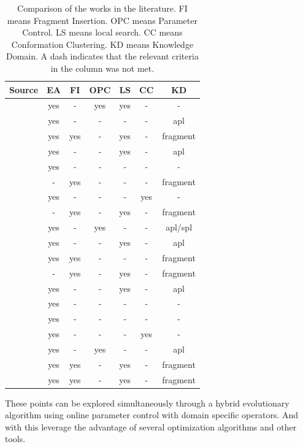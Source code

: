 \begin{table}
    \centering
    \begin{tabular}{r|c|c|c|c|c|c} \hline \hline
        Source                       & EA  & FI  & OPC & LS  & CC  & KD       \\ \hline \hline
        \cite{sudha2015protein}      & yes & -   & yes & yes & -   & -        \\ \hline
        \cite{borguesan2015apl}      & yes & -   & -   & -   & -   & apl      \\ \hline
        \cite{garza2016generating}   & yes & yes & -   & yes & -   & fragment \\ \hline
        \cite{correa2016memetic}     & yes & -   & -   & yes & -   & apl      \\ \hline
        \cite{narloch2017protein}    & yes & -   & -   & -   & -   & -        \\ \hline
        \cite{hao2017double}         & -   & yes & -   & -   & -   & fragment \\ \hline
        \cite{hao2017conformational} & yes & -   & -   & -   & yes & -        \\ \hline
        \cite{de2017sequential}      & -   & yes & -   & yes & -   & fragment \\ \hline
        \cite{oliveira2017sade}      & yes & -   & yes & -   & -   & apl/spl  \\ \hline
        \cite{borguesan2018genetic}  & yes & -   & -   & yes & -   & apl      \\ \hline
        \cite{silva2018multistage}   & yes & yes & -   & -   & -   & fragment \\ \hline
        \cite{kandathil2018improved} & -   & yes & -   & yes & -   & fragment \\ \hline
        \cite{correa2018knowledge}   & yes & -   & -   & yes & -   & apl      \\ \hline
        \cite{gao2018incorporation}  & yes & -   & -   & -   & -   & -        \\ \hline
        \cite{alvarez2018protein}    & yes & -   & -   & -   & -   & -        \\ \hline
        \cite{song2018adoption}      & yes & -   & -   & -   & yes & -        \\ \hline
        \cite{narloch2019knowledge}  & yes & -   & yes & -   & -   & apl      \\ \hline
        \cite{varela2019crowding}    & yes & yes & -   & yes & -   & fragment \\ \hline
        \cite{zaman2019balancing}    & yes & yes & -   & yes & -   & fragment \\ \hline \hline
    \end{tabular}
    \caption{Comparison of the works in the literature. FI means Fragment
    Insertion. OPC means Parameter Control. LS means local search. CC means
    Conformation Clustering. KD means Knowledge Domain. A dash indicates that
    the relevant criteria in the column was not met.}
    \label{tab:related-works-comparison}
\end{table}

These points can be explored simultaneously through a hybrid evolutionary
algorithm using online parameter control with domain specific operators. And with this leverage the advantage of several optimization algorithms and other tools.

